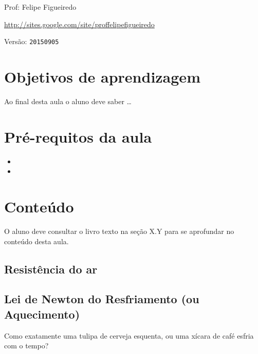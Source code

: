 \documentclass[a4paper]{article}
\begin{document}
\parbox[c]{.825\textwidth}{\raggedright%
{Prof: Felipe Figueiredo\par}
{\url{http://sites.google.com/site/proffelipefigueiredo}\par}
}

Versão: \verb|20150905|



\section{Objetivos de aprendizagem}

Ao final desta aula o aluno deve saber \ldots


\section{Pré-requitos da aula}

\begin{itemize}
\item 
\item 
\end{itemize}

\section{Conteúdo}

O aluno deve consultar o livro texto na seção X.Y para se aprofundar
no conteúdo desta aula.


\subsection{Resistência do ar}


\subsection{Lei de Newton do Resfriamento (ou Aquecimento)}

Como exatamente uma tulipa de cerveja esquenta, ou uma xícara de café
esfria com o tempo?
\end{document}
